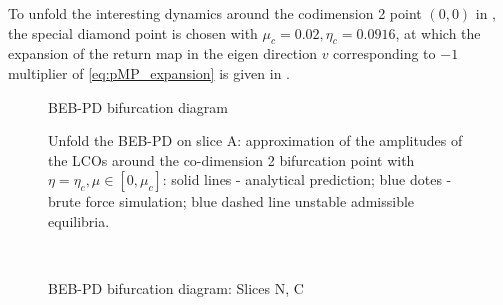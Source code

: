 To unfold the interesting dynamics around the codimension 2 point $(0,0)$ in , the
special diamond point is chosen with $\mu_c = 0.02, \eta_c = 0.0916$, at which the expansion of the return map
in the eigen direction $v$ corresponding to $-1$ multiplier of \cref{eq:pMP_expansion} is given in
.
%
\begin{figure}[ht!]
	\centering
	\caption{BEB-PD bifurcation diagram}
	\label{fig:codim2_PD_curve}
\end{figure}
%
\begin{figure}[ht!]
	\centering
	\caption{Unfold the BEB-PD on slice A: approximation of the amplitudes of the LCOs around the co-dimension 2
		bifurcation point with
		$\eta = \eta_c,\mu \in [0,\mu_c]$: solid lines - analytical prediction; blue dotes -brute force simulation; blue dashed line  unstable admissible equilibria.}
	\label{fig:amplitude_approximation_PD}
\end{figure}
%
%
\begin{figure}[ht!]
	\centering
	\\
	\label{fig:codim2_PD_unfold}
	\caption{BEB-PD bifurcation diagram: Slices N, C}
\end{figure}
%
